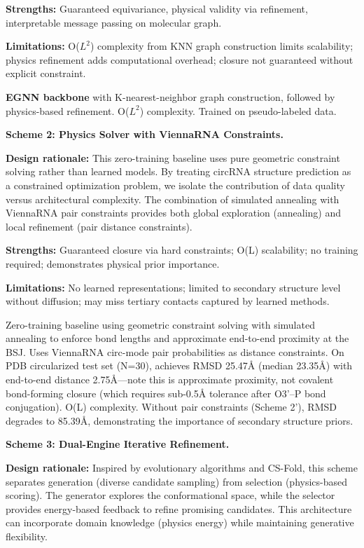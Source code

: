 \documentclass[12pt]{article}
\begin{document}
\textbf{Strengths:} Guaranteed equivariance, physical validity via refinement, interpretable message passing on molecular graph.

\textbf{Limitations:} O($L^2$) complexity from KNN graph construction limits scalability; physics refinement adds computational overhead; closure not guaranteed without explicit constraint.

\textbf{EGNN backbone} with K-nearest-neighbor graph construction, followed by physics-based refinement. O($L^2$) complexity. Trained on pseudo-labeled data.

\textbf{Scheme 2: Physics Solver with ViennaRNA Constraints.}

\textbf{Design rationale:} This zero-training baseline uses pure geometric constraint solving rather than learned models. By treating circRNA structure prediction as a constrained optimization problem, we isolate the contribution of data quality versus architectural complexity. The combination of simulated annealing with ViennaRNA pair constraints provides both global exploration (annealing) and local refinement (pair distance constraints).

\textbf{Strengths:} Guaranteed closure via hard constraints; O(L) scalability; no training required; demonstrates physical prior importance.

\textbf{Limitations:} No learned representations; limited to secondary structure level without diffusion; may miss tertiary contacts captured by learned methods.

Zero-training baseline using geometric constraint solving with simulated annealing to enforce bond lengths and approximate end-to-end proximity at the BSJ. Uses ViennaRNA circ-mode pair probabilities as distance constraints. On PDB circularized test set (N=30), achieves RMSD 25.47Å (median 23.35Å) with end-to-end distance 2.75Å---note this is approximate proximity, not covalent bond-forming closure (which requires sub-0.5Å tolerance after O3'–P bond conjugation). O(L) complexity. Without pair constraints (Scheme 2'), RMSD degrades to 85.39Å, demonstrating the importance of secondary structure priors.

\textbf{Scheme 3: Dual-Engine Iterative Refinement.}

\textbf{Design rationale:} Inspired by evolutionary algorithms and CS-Fold, this scheme separates generation (diverse candidate sampling) from selection (physics-based scoring). The generator explores the conformational space, while the selector provides energy-based feedback to refine promising candidates. This architecture can incorporate domain knowledge (physics energy) while maintaining generative flexibility.
\end{document}
